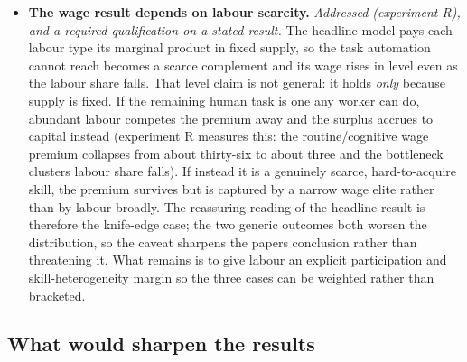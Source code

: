 \documentclass[11pt]{article}
\begin{document}
\begin{itemize}
  capital, output held) rather than cyclical, which suits an automation
  model but means it does not capture demand-driven joblessness. The
  remaining limits are calibration, not structure: the displacement
  pass-through, the benefit replacement rate and the UBI labour-supply
  response are anchored to literature ranges (the calibration table in
  section 6M) but not estimated for this market, and the sensitivity
  analysis (Figure 21) shows the unemployment rate is the most
  parameter-sensitive outcome in the model, swinging on the
  pass-through, so it is reported as a range set by the
  displacement-versus-reinstatement balance rather than a point.
\item
  \textbf{The wage result depends on labour scarcity.}
  \emph{Addressed (experiment R), and a required qualification on a
  stated result.} The headline model pays each labour type its marginal
  product in fixed supply, so the task automation cannot reach becomes a
  scarce complement and its wage rises in level even as the labour share
  falls. That level claim is not general: it holds \emph{only} because
  supply is fixed. If the remaining human task is one any worker can do,
  abundant labour competes the premium away and the surplus accrues to
  capital instead (experiment R measures this: the routine/cognitive wage
  premium collapses from about thirty-six to about three and the
  bottleneck cluster\textquotesingle s labour share falls). If instead it
  is a genuinely scarce, hard-to-acquire skill, the premium survives but
  is captured by a narrow wage elite rather than by labour broadly. The
  reassuring reading of the headline result is therefore the knife-edge
  case; the two generic outcomes both worsen the distribution, so the
  caveat sharpens the paper\textquotesingle s conclusion rather than
  threatening it. What remains is to give labour an explicit
  participation and skill-heterogeneity margin so the three cases can be
  weighted rather than bracketed.
\end{itemize}

\hypertarget{what-would-sharpen-the-results}{%
\subsection{What would sharpen the
results}\label{what-would-sharpen-the-results}}
\end{document}
